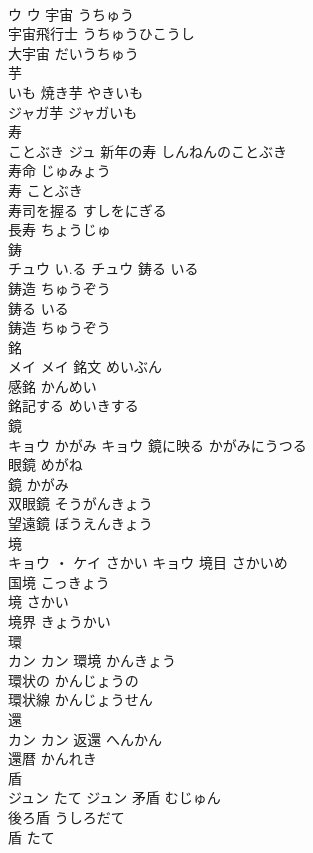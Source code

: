 \documentclass[8pt]{extreport}
\begin{document}
\begin{CJK}{UTF8}{min}
\\	ウ		ウ	宇宙	うちゅう	
\\	宇宙飛行士	うちゅうひこうし	
\\	大宇宙	だいうちゅう	
\\	芋	
\\	いも		焼き芋	やきいも	
\\	ジャガ芋	ジャガいも	
\\	寿	
\\	ことぶき	ジュ	新年の寿	しんねんのことぶき	
\\	寿命	じゅみょう	
\\	寿	ことぶき	
\\	寿司を握る	すしをにぎる	
\\	長寿	ちょうじゅ	
\\	鋳	
\\	チュウ	い.る	チュウ	鋳る	いる	
\\	鋳造	ちゅうぞう	
\\	鋳る	いる	
\\	鋳造	ちゅうぞう	
\\	銘	
\\	メイ		メイ	銘文	めいぶん	
\\	感銘	かんめい	
\\	銘記する	めいきする	
\\	鏡	
\\	キョウ	かがみ	キョウ	鏡に映る	かがみにうつる	
\\	眼鏡	めがね	
\\	鏡	かがみ	
\\	双眼鏡	そうがんきょう	
\\	望遠鏡	ぼうえんきょう	
\\	境	
\\	キョウ ・ ケイ	さかい	キョウ	境目	さかいめ	
\\	国境	こっきょう	
\\	境	さかい	
\\	境界	きょうかい	
\\	環	
\\	カン		カン	環境	かんきょう	
\\	環状の	かんじょうの	
\\	環状線	かんじょうせん	
\\	還	
\\	カン		カン	返還	へんかん	
\\	還暦	かんれき	
\\	盾	
\\	ジュン	たて	ジュン	矛盾	むじゅん	
\\	後ろ盾	うしろだて	
\\	盾	たて	

\end{CJK}
\end{document}
